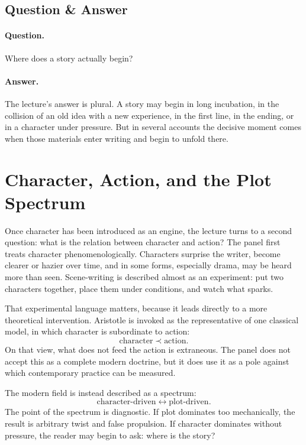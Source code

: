 \subsection{Question \& Answer}

\paragraph{Question.} Where does a story actually begin?

\paragraph{Answer.} The lecture's answer is plural. A story may begin in long incubation, in the collision of an old idea with a new experience, in the first line, in the ending, or in a character under pressure. But in several accounts the decisive moment comes when those materials enter writing and begin to unfold there.

\section{Character, Action, and the Plot Spectrum}

Once character has been introduced as an engine, the lecture turns to a second question: what is the relation between character and action? The panel first treats character phenomenologically. Characters surprise the writer, become clearer or hazier over time, and in some forms, especially drama, may be heard more than seen. Scene-writing is described almost as an experiment: put two characters together, place them under conditions, and watch what sparks.

That experimental language matters, because it leads directly to a more theoretical intervention. Aristotle is invoked as the representative of one classical model, in which character is subordinate to action:
\begin{equation}
\text{character} \prec \text{action}.
\end{equation}
On that view, what does not feed the action is extraneous. The panel does not accept this as a complete modern doctrine, but it does use it as a pole against which contemporary practice can be measured.

The modern field is instead described as a spectrum:
\begin{equation}
\text{character-driven} \leftrightarrow \text{plot-driven}.
\end{equation}
The point of the spectrum is diagnostic. If plot dominates too mechanically, the result is arbitrary twist and false propulsion. If character dominates without pressure, the reader may begin to ask: where is the story?

